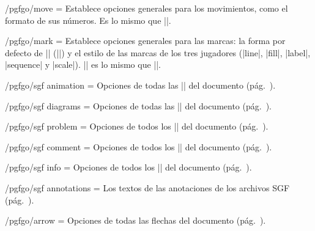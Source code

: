 \begin{key}{/pgfgo/move = }
	Establece opciones generales para los movimientos, como el formato de sus números. Es lo mismo que ||.
\end{key}

\begin{key}{/pgfgo/mark = }
	Establece opciones generales para las marcas: la forma por defecto de |\marks| (||) y el estilo de las marcas de los tres jugadores (|line|, |fill|, |label|, |sequence| y |scale|). || es lo mismo que ||.
\end{key}

\begin{key}{/pgfgo/sgf animation = }
	Opciones de todas las |\sgfanimation| del documento (pág.~\pageref{subsec:sgf}).
\end{key}

\begin{key}{/pgfgo/sgf diagrams = }
	Opciones de todas las |\sgfdiagrams| del documento (pág.~\pageref{subsec:sgf}).
\end{key}

\begin{key}{/pgfgo/sgf problem = }
	Opciones de todos los |\sgfproblem| del documento (pág.~\pageref{subsec:sgf}).
\end{key}

\begin{key}{/pgfgo/sgf comment = }
	Opciones de todos los |\sgfcomment| del documento (pág.~\pageref{subsec:sgf}).
\end{key}

\begin{key}{/pgfgo/sgf info = }
	Opciones de todos los |\sgfinfo| del documento (pág.~\pageref{subsec:sgf}).
\end{key}

\begin{key}{/pgfgo/sgf annotations = }
	Los textos de las anotaciones de los archivos SGF (pág.~\pageref{subsec:sgf}).
\end{key}

\begin{key}{/pgfgo/arrow = }
	Opciones de todas las flechas del documento (pág.~\pageref{subsec:flechas}).
\end{key}

